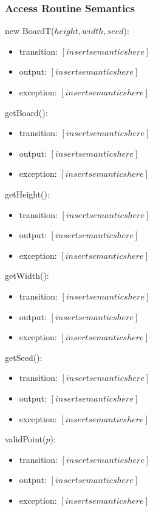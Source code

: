\documentclass[12pt]{article}
\begin{document}
\subsubsection* {Access Routine Semantics}
\noindent new BoardT($height, width, seed$):
\begin{itemize}
    \item transition: $[insert semantics here]$
    \item output: $[insert semantics here]$
    \item exception: $[insert semantics here]$
\end{itemize}

\noindent getBoard():
\begin{itemize}
    \item transition: $[insert semantics here]$
    \item output: $[insert semantics here]$
    \item exception: $[insert semantics here]$
\end{itemize}

\noindent getHeight():
\begin{itemize}
    \item transition: $[insert semantics here]$
    \item output: $[insert semantics here]$
    \item exception: $[insert semantics here]$
\end{itemize}

\noindent getWidth():
\begin{itemize}
    \item transition: $[insert semantics here]$
    \item output: $[insert semantics here]$
    \item exception: $[insert semantics here]$
\end{itemize}

\noindent getSeed():
\begin{itemize}
    \item transition: $[insert semantics here]$
    \item output: $[insert semantics here]$
    \item exception: $[insert semantics here]$
\end{itemize}

\noindent validPoint($p$):
\begin{itemize}
    \item transition: $[insert semantics here]$
    \item output: $[insert semantics here]$
    \item exception: $[insert semantics here]$
\end{itemize}
\end{document}
